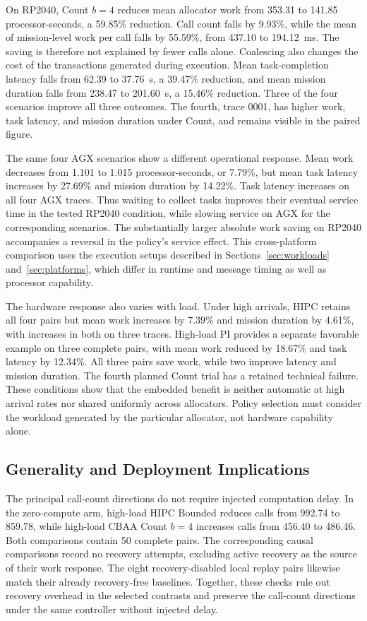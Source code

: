 \documentclass[conference]{IEEEtran}
\begin{document}
On RP2040, Count $b=4$ reduces mean allocator work from 353.31 to 141.85 processor-seconds, a 59.85\% reduction. Call count falls by 9.93\%, while the mean of mission-level work per call falls by 55.59\%, from 437.10 to 194.12~ms. The saving is therefore not explained by fewer calls alone. Coalescing also changes the cost of the transactions generated during execution. Mean task-completion latency falls from 62.39 to 37.76~s, a 39.47\% reduction, and mean mission duration falls from 238.47 to 201.60~s, a 15.46\% reduction. Three of the four scenarios improve all three outcomes. The fourth, trace 0001, has higher work, task latency, and mission duration under Count, and remains visible in the paired figure.

The same four AGX scenarios show a different operational response. Mean work decreases from 1.101 to 1.015 processor-seconds, or 7.79\%, but mean task latency increases by 27.69\% and mission duration by 14.22\%. Task latency increases on all four AGX traces. Thus waiting to collect tasks improves their eventual service time in the tested RP2040 condition, while slowing service on AGX for the corresponding scenarios. The substantially larger absolute work saving on RP2040 accompanies a reversal in the policy's service effect. This cross-platform comparison uses the execution setups described in Sections~\ref{sec:workloads} and~\ref{sec:platforms}, which differ in runtime and message timing as well as processor capability.

The hardware response also varies with load. Under high arrivals, HIPC retains all four pairs but mean work increases by 7.39\% and mission duration by 4.61\%, with increases in both on three traces. High-load PI provides a separate favorable example on three complete pairs, with mean work reduced by 18.67\% and task latency by 12.34\%. All three pairs save work, while two improve latency and mission duration. The fourth planned Count trial has a retained technical failure. These conditions show that the embedded benefit is neither automatic at high arrival rates nor shared uniformly across allocators. Policy selection must consider the workload generated by the particular allocator, not hardware capability alone.

\subsection{Generality and Deployment Implications}
\label{sec:generality_results}
The principal call-count directions do not require injected computation delay. In the zero-compute arm, high-load HIPC Bounded reduces calls from 992.74 to 859.78, while high-load CBAA Count $b=4$ increases calls from 456.40 to 486.46. Both comparisons contain 50 complete pairs. The corresponding causal comparisons record no recovery attempts, excluding active recovery as the source of their work response. The eight recovery-disabled local replay pairs likewise match their already recovery-free baselines. Together, these checks rule out recovery overhead in the selected contrasts and preserve the call-count directions under the same controller without injected delay.
\end{document}
